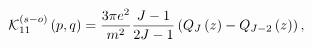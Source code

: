 \begin{equation}
\mathcal{K}_{11}^{\left( s-o\right) }\left( p,q\right) =\frac{3\pi e^{2}}{%
m^{2}}\frac{J-1}{2J-1}\left( Q_{J}\left( z\right) -Q_{J-2}\left( z\right)
\right) ,
\end{equation}

